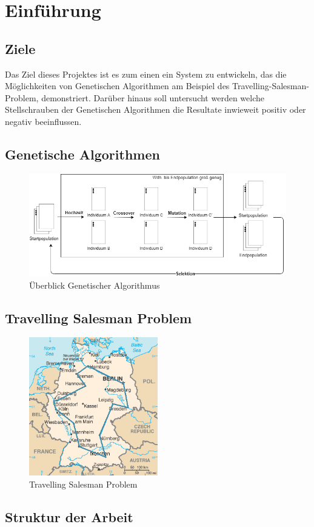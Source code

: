 
\section{Einführung}

\subsection{Ziele}

Das Ziel dieses Projektes ist es zum einen ein System zu entwickeln, das die Möglichkeiten von Genetischen Algorithmen am Beispiel des Travelling-Salesman-Problem, demonstriert.
Darüber hinaus soll untersucht werden welche Stellschrauben der Genetischen Algorithmen die Resultate inwieweit positiv oder negativ beeinflussen.

\subsection{Genetische Algorithmen}

\begin{figure}[H]
\centering
\includegraphics[width=1\textwidth]{img/Vortrag/Genetic_Algorithm.png}
\caption{Überblick Genetischer Algorithmus}
\label{fig:genetic_algorithm}
\end{figure}

\subsection{Travelling Salesman Problem}

\begin{figure}[H]
\centering
\includegraphics[width=0.5\textwidth]{img/Vortrag/TSP_Deutschland.png}
\caption{Travelling Salesman Problem}
\label{fig:TSP}
\end{figure}

\subsection{Struktur der Arbeit}

